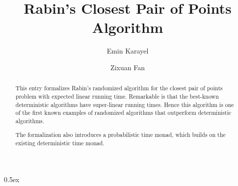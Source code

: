 \documentclass[11pt,a4paper]{article}
\begin{document}
\title{Rabin's Closest Pair of Points Algorithm}
\author{Emin Karayel \and Zixuan Fan}
\maketitle

\begin{abstract}
This entry formalizes Rabin's randomized algorithm for the closest pair of points problem
with expected linear running time. Remarkable is that the best-known deterministic algorithms have
super-linear running times. Hence this algorithm is one of the first known examples of randomized
algorithms that outperform deterministic algorithms.

The formalization also introduces a probabilistic time monad, which builds on the existing
deterministic time monad.
\end{abstract}

\tableofcontents
\parindent 0pt\parskip 0.5ex





\end{document}
